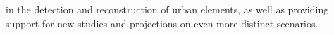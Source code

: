 \begin{resumo}
in the detection and reconstruction of urban elements, as well as providing support for new studies and projections on even more distinct scenarios.

\end{resumo}
